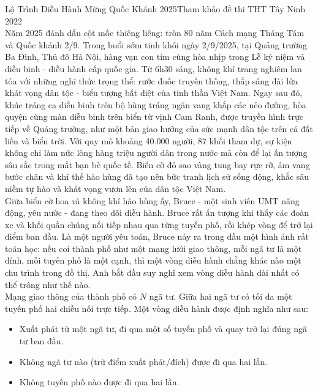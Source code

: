 \clearpage

\begin{baitap}{Lộ Trình Diễu Hành Mừng Quốc Khánh 2025}{Tham khảo đề thi THT Tây Ninh 2022}\\

Năm 2025 đánh dấu cột mốc thiêng liêng: tròn 80 năm Cách mạng Tháng Tám và Quốc khánh 2/9. Trong buổi sớm tinh khôi ngày 2/9/2025, tại Quảng trường Ba Đình, Thủ đô Hà Nội, hàng vạn con tim cùng hòa nhịp trong Lễ kỷ niệm và diễu binh - diễu hành cấp quốc gia. Từ 6h30 sáng, không khí trang nghiêm lan tỏa với những nghi thức trọng thể: rước đuốc truyền thống, thắp sáng đài lửa khát vọng dân tộc - biểu tượng bất diệt của tinh thần Việt Nam. Ngay sau đó, khúc tráng ca diễu binh trên bộ hùng tráng ngân vang khắp các nẻo đường, hòa quyện cùng màn diễu binh trên biển từ vịnh Cam Ranh, được truyền hình trực tiếp về Quảng trường, như một bản giao hưởng của sức mạnh dân tộc trên cả đất liền và biển trời. Với quy mô khoảng 40.000 người, 87 khối tham dự, sự kiện không chỉ làm nức lòng hàng triệu người dân trong nước mà còn để lại ấn tượng sâu sắc trong mắt bạn bè quốc tế. Biển cờ đỏ sao vàng tung bay rực rỡ, âm vang bước chân và khí thế hào hùng đã tạo nên bức tranh lịch sử sống động, khắc sâu niềm tự hào và khát vọng vươn lên của dân tộc Việt Nam.\\

Giữa biển cờ hoa và không khí hào hùng ấy, Bruce - một sinh viên UMT năng động, yêu nước - đang theo dõi diễu hành. Bruce rất ấn tượng khi thấy các đoàn xe và khối quần chúng nối tiếp nhau qua từng tuyến phố, rồi khép vòng để trở lại điểm ban đầu. Là một người yêu toán, Bruce nảy ra trong đầu một hình ảnh rất toán học: nếu coi thành phố như một mạng lưới giao thông, mỗi ngã tư là một đỉnh, mỗi tuyến phố là một cạnh, thì một vòng diễu hành chẳng khác nào một chu trình trong đồ thị. Anh bắt đầu suy nghĩ xem vòng diễu hành dài nhất có thể trông như thế nào.\\

Mạng giao thông của thành phố có $N$ ngã tư. Giữa hai ngã tư có tối đa một tuyến phố hai chiều nối trực tiếp. Một vòng diễu hành được định nghĩa như sau:
\begin{itemize}
    \item Xuất phát từ một ngã tư, đi qua một số tuyến phố và quay trở lại đúng ngã tư ban đầu.
    \item Không ngã tư nào (trừ điểm xuất phát/đích) được đi qua hai lần.
    \item Không tuyến phố nào được đi qua hai lần.
\end{itemize}


\end{baitap}
